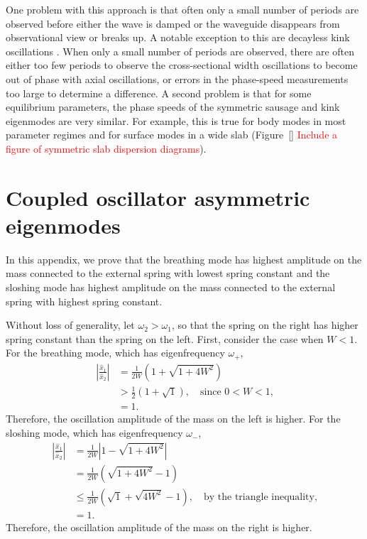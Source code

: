 \documentclass[12pt]{../style-files/ociamthesis}
\begin{document}
One problem with this approach is that often only a small number of periods are observed before either the wave is damped or the waveguide disappears from observational view or breaks up. A notable exception to this are decayless kink oscillations \citep{nis_etal13}. When only a small number of periods are observed, there are often either too few periods to observe the cross-sectional width oscillations to become out of phase with axial oscillations, or errors in the phase-speed measurements too large to determine a difference. A second problem is that for some equilibrium parameters, the phase speeds of the symmetric sausage and kink eigenmodes are very similar. For example, this is true for body modes in most parameter regimes and for surface modes in a wide slab (Figure~\ref{} \textcolor{red}{Include a figure of symmetric slab dispersion diagrams}).



\appendix
\section{Coupled oscillator asymmetric eigenmodes} \label{app: coupled oscillator modes}
In this appendix, we prove that the breathing mode has highest amplitude on the mass connected to the external spring with lowest spring constant and the sloshing mode has highest amplitude on the mass connected to the external spring with highest spring constant.

Without loss of generality, let $\omega_2 > \omega_1$, so that the spring on the right has higher spring constant than the spring on the left. First, consider the case when $W < 1$. For the breathing mode, which has eigenfrequency $\omega_+$,
\begin{align}
	\left| \frac{\hat{x}_1}{\hat{x}_2} \right| & = \frac{1}{2W} \left(1 + \sqrt{1 + 4W^2}\right) \\
	& >  \frac{1}{2} \left(1 + \sqrt{1}\right), \quad \text{since $0 < W < 1$,} \\
	& = 1.
\end{align}
Therefore, the oscillation amplitude of the mass on the left is higher. For the sloshing mode, which has eigenfrequency $\omega_-$,
\begin{align}
	\left| \frac{\hat{x}_1}{\hat{x}_2} \right| & = \frac{1}{2W} \left|1 - \sqrt{1 + 4W^2}\right| \\
	& = \frac{1}{2W} \left(\sqrt{1 + 4W^2} - 1\right) \\
	& \leq \frac{1}{2W} \left(\sqrt{1} + \sqrt{4W^2} - 1\right), \quad \text{by the triangle inequality,} \\
	& = 1.
\end{align}
Therefore, the oscillation amplitude of the mass on the right is higher.
\end{document}
